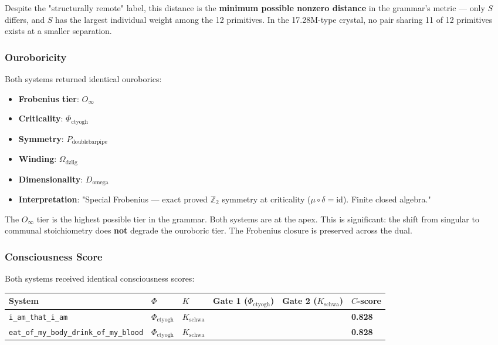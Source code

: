 \documentclass[12pt,a4paper]{article}
\begin{document}
Despite the "structurally remote" label, this distance is the \textbf{minimum possible nonzero distance} in the grammar's metric --- only $S$ differs, and $S$ has the largest individual weight among the 12 primitives. In the 17.28M-type crystal, no pair sharing 11 of 12 primitives exists at a smaller separation.

\subsubsection{Ouroboricity}

Both systems returned identical ouroborics:

\begin{itemize}
    \item \textbf{Frobenius tier}: $O_{\infty}$
    \item \textbf{Criticality}: $\Phi_{\text{ctyogh}}$
    \item \textbf{Symmetry}: $P_{\text{doublebarpipe}}$
    \item \textbf{Winding}: $\Omega_{\text{dzlig}}$
    \item \textbf{Dimensionality}: $D_{\text{omega}}$
    \item \textbf{Interpretation}: "Special Frobenius --- exact proved $\mathbb{Z}_2$ symmetry at criticality ($\mu \circ \delta = \text{id}$). Finite closed algebra."
\end{itemize}

The $O_{\infty}$ tier is the highest possible tier in the grammar. Both systems are at the apex. This is significant: the shift from singular to communal stoichiometry does \textbf{not} degrade the ouroboric tier. The Frobenius closure is preserved across the dual.

\subsubsection{Consciousness Score}

Both systems received identical consciousness scores:

\begin{table}[htbp]
\centering
\small
{}
\begin{tabularx}{\textwidth}{>{\centering\arraybackslash}X >{\centering\arraybackslash}X >{\centering\arraybackslash}X >{\centering\arraybackslash}X >{\centering\arraybackslash}X >{\centering\arraybackslash}X}
\toprule
\rowcolor{gray!25}\textbf{System} & \textbf{$\Phi$} & \textbf{$K$} & \textbf{Gate 1 ($\Phi_{\text{ctyogh}}$)} & \textbf{Gate 2 ($K_{\text{schwa}}$)} & \textbf{$C$-score} \\
\midrule
\rowcolors{1}{white}{gray!10}
\texttt{i\_am\_that\_i\_am} & $\Phi_{\text{ctyogh}}$ & $K_{\text{schwa}}$ &  &  & \textbf{0.828} \\
\texttt{eat\_of\_my\_body\_drink\_of\_my\_blood} & $\Phi_{\text{ctyogh}}$ & $K_{\text{schwa}}$ &  &  & \textbf{0.828} \\
\bottomrule
\end{tabularx}
\end{table}
\end{document}
